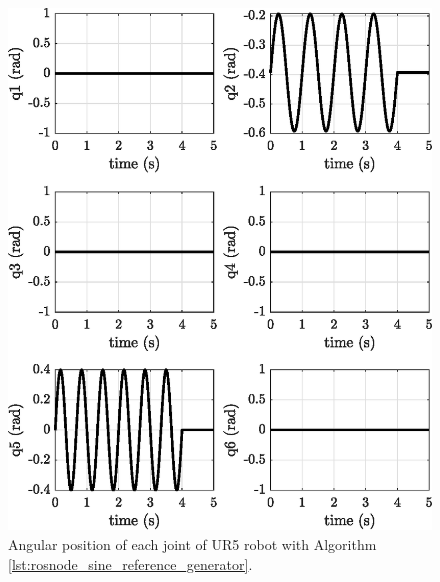 \begin{figure}[h]
    \centering
    \includegraphics{images/act_1.1/joint_position.eps}
    \caption{Angular position of each joint of UR5 robot with Algorithm \ref{lst:rosnode_sine_reference_generator}.}
    \label{fig:act_1.1_joint_position}
\end{figure}

